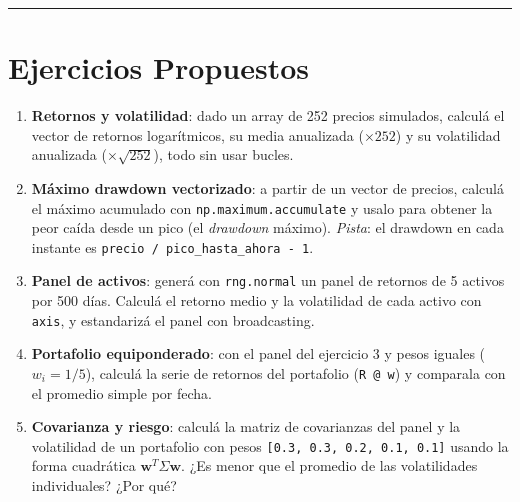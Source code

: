 \documentclass[
  spanish,
  letterpaper,
  DIV=11,
  numbers=noendperiod]{scrreprt}
\providecommand{\tightlist}{%
  \setlength{\itemsep}{0pt}\setlength{\parskip}{0pt}}
\begin{document}
\begin{center}\rule{0.5\linewidth}{0.5pt}\end{center}

\section{Ejercicios Propuestos}\label{ejercicios-propuestos-4}

\begin{tcolorbox}[enhanced jigsaw, bottomrule=.15mm, colback=white, opacitybacktitle=0.6, arc=.35mm, toprule=.15mm, opacityback=0, breakable, titlerule=0mm, left=2mm, coltitle=black, colbacktitle=quarto-callout-important-color!10!white, colframe=quarto-callout-important-color-frame, leftrule=.75mm, toptitle=1mm, bottomtitle=1mm, title=\textcolor{quarto-callout-important-color}{\faExclamation}\hspace{0.5em}{Ejercicios}, rightrule=.15mm]

\begin{enumerate}
\def\labelenumi{\arabic{enumi}.}
\tightlist
\item
  \textbf{Retornos y volatilidad}: dado un array de 252 precios
  simulados, calculá el vector de retornos logarítmicos, su media
  anualizada (\(\times 252\)) y su volatilidad anualizada
  (\(\times \sqrt{252}\)), todo sin usar bucles.
\item
  \textbf{Máximo drawdown vectorizado}: a partir de un vector de
  precios, calculá el máximo acumulado con
  \texttt{np.maximum.accumulate} y usalo para obtener la peor caída
  desde un pico (el \emph{drawdown} máximo). \emph{Pista}: el drawdown
  en cada instante es \texttt{precio\ /\ pico\_hasta\_ahora\ -\ 1}.
\item
  \textbf{Panel de activos}: generá con \texttt{rng.normal} un panel de
  retornos de 5 activos por 500 días. Calculá el retorno medio y la
  volatilidad de cada activo con \texttt{axis}, y estandarizá el panel
  con broadcasting.
\item
  \textbf{Portafolio equiponderado}: con el panel del ejercicio 3 y
  pesos iguales (\(w_i = 1/5\)), calculá la serie de retornos del
  portafolio (\texttt{R\ @\ w}) y comparala con el promedio simple por
  fecha.
\item
  \textbf{Covarianza y riesgo}: calculá la matriz de covarianzas del
  panel y la volatilidad de un portafolio con pesos
  \texttt{{[}0.3,\ 0.3,\ 0.2,\ 0.1,\ 0.1{]}} usando la forma cuadrática
  \(\mathbf{w}^T\Sigma\mathbf{w}\). ¿Es menor que el promedio de las
  volatilidades individuales? ¿Por qué?
\end{enumerate}

\end{tcolorbox}
\end{document}
